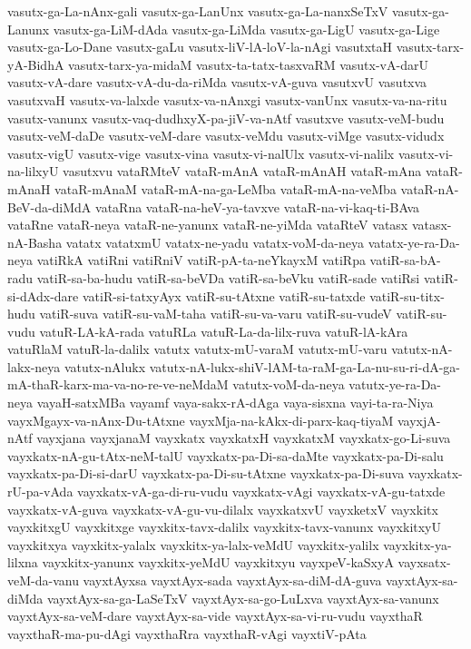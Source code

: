 {vasutx-ga-La-nAnx-gali
vasutx-ga-LanUnx
vasutx-ga-La-nanxSeTxV
vasutx-ga-Lanunx
vasutx-ga-LiM-dAda
vasutx-ga-LiMda
vasutx-ga-LigU
vasutx-ga-Lige
vasutx-ga-Lo-Dane
vasutx-gaLu
vasutx-liV-lA-loV-la-nAgi
vasutxtaH
vasutx-tarx-yA-BidhA
vasutx-tarx-ya-midaM
vasutx-ta-tatx-tasxvaRM
vasutx-vA-darU
vasutx-vA-dare
vasutx-vA-du-da-riMda
vasutx-vA-guva
vasutxvU
vasutxva
vasutxvaH
vasutx-va-lalxde
vasutx-va-nAnxgi
vasutx-vanUnx
vasutx-va-na-ritu
vasutx-vanunx
vasutx-vaq-dudhxyX-pa-jiV-va-nAtf
vasutxve
vasutx-veM-budu
vasutx-veM-daDe
vasutx-veM-dare
vasutx-veMdu
vasutx-viMge
vasutx-vidudx
vasutx-vigU
vasutx-vige
vasutx-vina
vasutx-vi-nalUlx
vasutx-vi-nalilx
vasutx-vi-na-lilxyU
vasutxvu
vataRMteV
vataR-mAnA
vataR-mAnAH
vataR-mAna
vataR-mAnaH
vataR-mAnaM
vataR-mA-na-ga-LeMba
vataR-mA-na-veMba
vataR-nA-BeV-da-diMdA
vataRna
vataR-na-heV-ya-tavxve
vataR-na-vi-kaq-ti-BAva
vataRne
vataR-neya
vataR-ne-yanunx
vataR-ne-yiMda
vataRteV
vatasx
vatasx-nA-Basha
vatatx
vatatxmU
vatatx-ne-yadu
vatatx-voM-da-neya
vatatx-ye-ra-Da-neya
vatiRkA
vatiRni
vatiRniV
vatiR-pA-ta-neYkayxM
vatiRpa
vatiR-sa-bA-radu
vatiR-sa-ba-hudu
vatiR-sa-beVDa
vatiR-sa-beVku
vatiR-sade
vatiRsi
vatiR-si-dAdx-dare
vatiR-si-tatxyAyx
vatiR-su-tAtxne
vatiR-su-tatxde
vatiR-su-titx-hudu
vatiR-suva
vatiR-su-vaM-taha
vatiR-su-va-varu
vatiR-su-vudeV
vatiR-su-vudu
vatuR-LA-kA-rada
vatuRLa
vatuR-La-da-lilx-ruva
vatuR-lA-kAra
vatuRlaM
vatuR-la-dalilx
vatutx
vatutx-mU-varaM
vatutx-mU-varu
vatutx-nA-lakx-neya
vatutx-nAlukx
vatutx-nA-lukx-shiV-lAM-ta-raM-ga-La-nu-su-ri-dA-ga-mA-thaR-karx-ma-va-no-re-ve-neMdaM
vatutx-voM-da-neya
vatutx-ye-ra-Da-neya
vayaH-satxMBa
vayamf
vaya-sakx-rA-dAga
vaya-sisxna
vayi-ta-ra-Niya
vayxMgayx-va-nAnx-Du-tAtxne
vayxMja-na-kAkx-di-parx-kaq-tiyaM
vayxjA-nAtf
vayxjana
vayxjanaM
vayxkatx
vayxkatxH
vayxkatxM
vayxkatx-go-Li-suva
vayxkatx-nA-gu-tAtx-neM-talU
vayxkatx-pa-Di-sa-daMte
vayxkatx-pa-Di-salu
vayxkatx-pa-Di-si-darU
vayxkatx-pa-Di-su-tAtxne
vayxkatx-pa-Di-suva
vayxkatx-rU-pa-vAda
vayxkatx-vA-ga-di-ru-vudu
vayxkatx-vAgi
vayxkatx-vA-gu-tatxde
vayxkatx-vA-guva
vayxkatx-vA-gu-vu-dilalx
vayxkatxvU
vayxketxV
vayxkitx
vayxkitxgU
vayxkitxge
vayxkitx-tavx-dalilx
vayxkitx-tavx-vanunx
vayxkitxyU
vayxkitxya
vayxkitx-yalalx
vayxkitx-ya-lalx-veMdU
vayxkitx-yalilx
vayxkitx-ya-lilxna
vayxkitx-yanunx
vayxkitx-yeMdU
vayxkitxyu
vayxpeV-kaSxyA
vayxsatx-veM-da-vanu
vayxtAyxsa
vayxtAyx-sada
vayxtAyx-sa-diM-dA-guva
vayxtAyx-sa-diMda
vayxtAyx-sa-ga-LaSeTxV
vayxtAyx-sa-go-LuLxva
vayxtAyx-sa-vanunx
vayxtAyx-sa-veM-dare
vayxtAyx-sa-vide
vayxtAyx-sa-vi-ru-vudu
vayxthaR
vayxthaR-ma-pu-dAgi
vayxthaRra
vayxthaR-vAgi
vayxtiV-pAta
}

